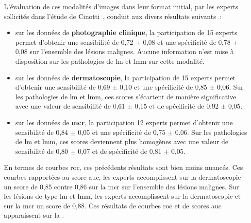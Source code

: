 L'évaluation de ces modalités d'images dans leur format initial, par les experts sollicités dans l'étude de Cinotti~, conduit aux divers résultats suivants~:
\begin{itemize}
    \item sur les données de \textbf{photographie clinique}, la participation de 15 experts permet d'obtenir une sensibilité de 0,72 $\pm$ 0,08 et une spécificité de 0,78 $\pm$ 0,08 sur l'ensemble des lésions malignes. Aucune information n'est mise à disposition sur les pathologies de \gls{lm} et \gls{lmm} sur cette modalité.
    \item sur les données de \textbf{dermatoscopie}, la participation de 15 experts permet d'obtenir une sensibilité de 0,69 $\pm$ 0,10 et une spécificité de 0,85 $\pm$ 0,06. Sur les pathologies de \gls{lm} et \gls{lmm}, ces scores s'écartent de manière significative avec une valeur de sensibilité de 0,61 $\pm$ 0,15 et de spécificité de 0,92 $\pm$ 0,05.
    \item sur les données de \textbf{\gls{mcr}}, la participation 12 experts permet d'obtenir une sensibilité de 0,84 $\pm$ 0,05 et une spécificité de 0,75 $\pm$ 0,06. Sur les pathologies de \gls{lm} et \gls{lmm}, ces scores deviennent plus homogènes avec une valeur de sensibilité de 0,80 $\pm$ 0,07 et de spécificité de 0,81 $\pm$ 0,05.
\end{itemize}\par

En termes de courbes \gls{roc}, ces précédents résultats sont bien moins nuancés. Ces courbes rapportées au score \gls{auc}, les experts accomplissent sur la dermatoscopie un score de 0,85 contre 0,86 sur la \gls{mcr} sur l'ensemble des lésions malignes. Sur les lésions de type \gls{lm} et \gls{lmm}, les experts accomplissent sur la dermatoscopie et sur la \gls{mcr} un score de 0,88. Ces résultats de courbes \gls{roc} et de scores \gls{auc} apparaissent sur la .\par

